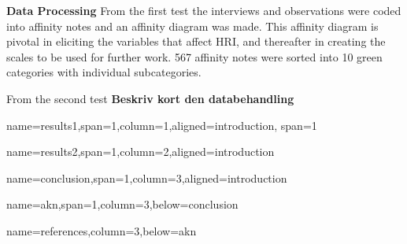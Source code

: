 \documentclass[paperwidth=160cm,paperheight=100cm,landscape,fontscale=0.3010]{baposter}
\begin{document}
\begin{poster}
{\textbf{Data Processing}
From the first test the interviews and observations were coded into affinity notes and an affinity diagram was made. This affinity diagram is pivotal in eliciting the variables that affect HRI, and thereafter in creating the scales to be used for further work. 
567 affinity notes were sorted into 10 green categories with individual subcategories. 

From the second test \textbf{Beskriv kort den databehandling}
}


{name=results1,span=1,column=1,aligned=introduction, span=1}
{\parskip 5pt 

}



{name=results2,span=1,column=2,aligned=introduction}
{\parskip 5pt


}


{name=conclusion,span=1,column=3,aligned=introduction}
{\parskip 5pt

}


{name=akn,span=1,column=3,below=conclusion}
{\parskip 5pt

}


{name=references,column=3,below=akn}
{
\renewcommand{\section}[2]{}%
\footnotesize
}



\end{poster}
\end{document}
